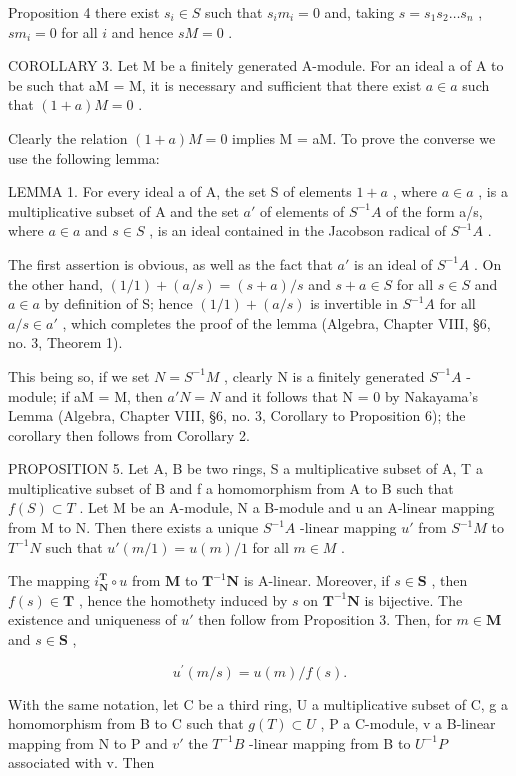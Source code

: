 Proposition 4 there exist \(s_i \in S\) such that \(s_i m_i = 0\) and, taking \(s = s_1 s_2 \ldots s_n\) , \(sm_i = 0\) for all \(i\) and hence \(sM = 0\) .

COROLLARY 3. Let M be a finitely generated A-module. For an ideal a of A to be such that aM = M, it is necessary and sufficient that there exist \(a \in a\) such that \((1 + a)M = 0\) .

Clearly the relation \((1 + a)M = 0\) implies M = aM. To prove the converse we use the following lemma:

LEMMA 1. For every ideal a of A, the set S of elements \(1 + a\) , where \(a \in a\) , is a multiplicative subset of A and the set \(a'\) of elements of \(S^{-1}A\) of the form a/s, where \(a \in a\) and \(s \in S\) , is an ideal contained in the Jacobson radical of \(S^{-1}A\) .

The first assertion is obvious, as well as the fact that \(a'\) is an ideal of \(S^{-1}A\) . On the other hand, \((1/1) + (a/s) = (s + a)/s\) and \(s + a \in S\) for all \(s \in S\) and \(a \in a\) by definition of S; hence \((1/1) + (a/s)\) is invertible in \(S^{-1}A\) for all \(a/s \in a'\) , which completes the proof of the lemma (Algebra, Chapter VIII, §6, no. 3, Theorem 1).

This being so, if we set \(N = S^{-1}M\) , clearly N is a finitely generated \(S^{-1}A\) -module; if aM = M, then \(a'N = N\) and it follows that N = 0 by Nakayama's Lemma (Algebra, Chapter VIII, §6, no. 3, Corollary to Proposition 6); the corollary then follows from Corollary 2.

PROPOSITION 5. Let A, B be two rings, S a multiplicative subset of A, T a multiplicative subset of B and f a homomorphism from A to B such that \(f(S) \subset T\) . Let M be an A-module, N a B-module and u an A-linear mapping from M to N. Then there exists a unique \(S^{-1}A\) -linear mapping \(u'\) from \(S^{-1}M\) to \(T^{-1}N\) such that \(u'(m/1) = u(m)/1\) for all \(m \in M\) .

The mapping \(i_{\mathbf{N}}^{\mathbf{T}} \circ u\) from \(\mathbf{M}\) to \(\mathbf{T}^{-1}\mathbf{N}\) is A-linear. Moreover, if \(s \in \mathbf{S}\) , then \(f(s) \in \mathbf{T}\) , hence the homothety induced by \(s\) on \(\mathbf{T}^{-1}\mathbf{N}\) is bijective. The existence and uniqueness of \(u'\) then follow from Proposition 3. Then, for \(m \in \mathbf{M}\) and \(s \in \mathbf{S}\) ,

\[
u ^ {\prime} (m / s) = u (m) / f (s).\tag{6}
\]

With the same notation, let C be a third ring, U a multiplicative subset of C, g a homomorphism from B to C such that \(g(T) \subset U\) , P a C-module, v a B-linear mapping from N to P and \(v'\) the \(T^{-1}B\) -linear mapping from B to \(U^{-1}P\) associated with v. Then


